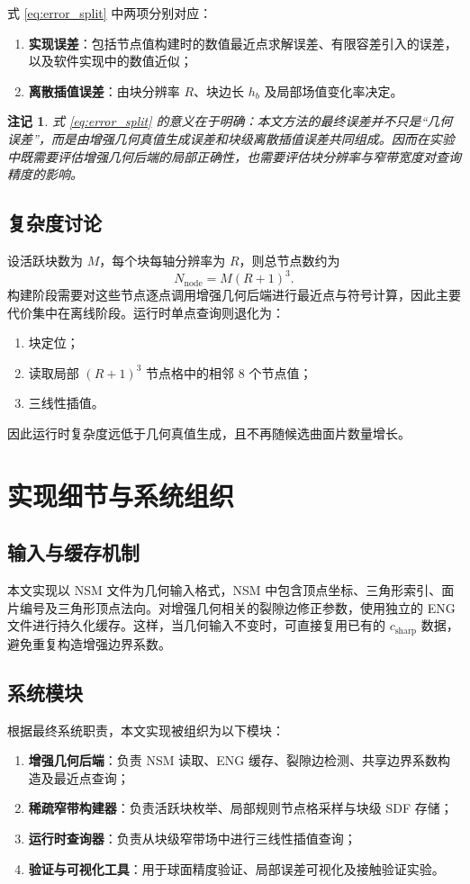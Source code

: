 \documentclass[11pt,a4paper]{ctexart}
\newtheorem{remark}{注记}
\begin{document}
式 \eqref{eq:error_split} 中两项分别对应：
\begin{enumerate}[leftmargin=2em]
    \item \textbf{实现误差}：包括节点值构建时的数值最近点求解误差、有限容差引入的误差，以及软件实现中的数值近似；
    \item \textbf{离散插值误差}：由块分辨率 $R$、块边长 $h_b$ 及局部场值变化率决定。
\end{enumerate}

\begin{remark}
式 \eqref{eq:error_split} 的意义在于明确：本文方法的最终误差并不只是“几何误差”，而是由增强几何真值生成误差和块级离散插值误差共同组成。因而在实验中既需要评估增强几何后端的局部正确性，也需要评估块分辨率与窄带宽度对查询精度的影响。
\end{remark}

\subsection{复杂度讨论}
设活跃块数为 $M$，每个块每轴分辨率为 $R$，则总节点数约为
\[
N_{\mathrm{node}} = M(R+1)^3.
\]
构建阶段需要对这些节点逐点调用增强几何后端进行最近点与符号计算，因此主要代价集中在离线阶段。运行时单点查询则退化为：
\begin{enumerate}[leftmargin=2em]
    \item 块定位；
    \item 读取局部 $(R+1)^3$ 节点格中的相邻 8 个节点值；
    \item 三线性插值。
\end{enumerate}
因此运行时复杂度远低于几何真值生成，且不再随候选曲面片数量增长。

\section{实现细节与系统组织}

\subsection{输入与缓存机制}
本文实现以 NSM 文件为几何输入格式，NSM 中包含顶点坐标、三角形索引、面片编号及三角形顶点法向。对增强几何相关的裂隙边修正参数，使用独立的 ENG 文件进行持久化缓存。这样，当几何输入不变时，可直接复用已有的 $c_{\mathrm{sharp}}$ 数据，避免重复构造增强边界系数。

\subsection{系统模块}
根据最终系统职责，本文实现被组织为以下模块：
\begin{enumerate}[leftmargin=2em]
    \item \textbf{增强几何后端}：负责 NSM 读取、ENG 缓存、裂隙边检测、共享边界系数构造及最近点查询；
    \item \textbf{稀疏窄带构建器}：负责活跃块枚举、局部规则节点格采样与块级 SDF 存储；
    \item \textbf{运行时查询器}：负责从块级窄带场中进行三线性插值查询；
    \item \textbf{验证与可视化工具}：用于球面精度验证、局部误差可视化及接触验证实验。
\end{enumerate}
\end{document}
